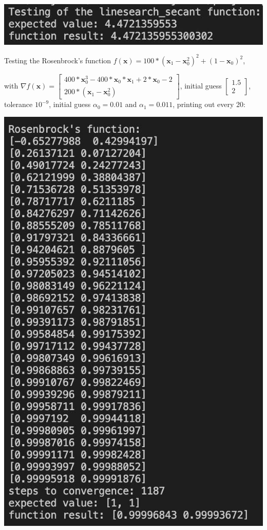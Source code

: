 \documentclass{article}
\begin{document}
\includegraphics[scale=0.5]{linesearch.jpeg}

\bigskip

Testing the Rosenbrock's function $f(\textbf{x}) = 100*(\textbf{x}_1-\textbf{x}_0^2)^2+(1-\textbf{x}_0)^2$, 

with 
$\nabla f(\textbf{x}) = \begin{bmatrix}
400*\textbf{x}_0^3 - 400*\textbf{x}_0*\textbf{x}_1 + 2*\textbf{x}_0 - 2 \\
200*(\textbf{x}_1 - \textbf{x}_0^2)
\end{bmatrix}$, initial guess $\begin{bmatrix}
    1.5 \\
    2
\end{bmatrix}$, tolerance $10^{-9}$, initial guess $\alpha_0=0.01$ and $\alpha_1=0.011$, printing out every 20:

\bigskip

\includegraphics[scale=0.35]{rosennbrock's.jpeg}
\end{document}
